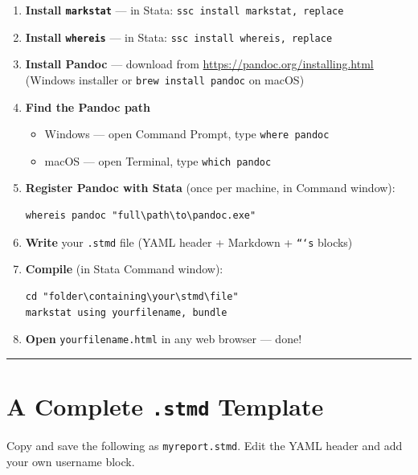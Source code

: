 \documentclass[paper=a4, fontsize=11pt]{scrartcl}
\newcommand{\horrule}[1]{\rule{\linewidth}{#1}}
\begin{document}
\begin{enumerate}
  \item[\(\square\)] \textbf{Install \texttt{markstat}} --- in Stata: \texttt{ssc install markstat, replace}
  \item[\(\square\)] \textbf{Install \texttt{whereis}} --- in Stata: \texttt{ssc install whereis, replace}
  \item[\(\square\)] \textbf{Install Pandoc} --- download from \url{https://pandoc.org/installing.html}
        (Windows installer or \texttt{brew install pandoc} on macOS)
  \item[\(\square\)] \textbf{Find the Pandoc path}
        \begin{itemize}
          \item Windows --- open Command Prompt, type \texttt{where pandoc}
          \item macOS --- open Terminal, type \texttt{which pandoc}
        \end{itemize}
  \item[\(\square\)] \textbf{Register Pandoc with Stata} (once per machine, in Command window):
\begin{lstlisting}[style=stata]
whereis pandoc "full\path\to\pandoc.exe"
\end{lstlisting}
  \item[\(\square\)] \textbf{Write} your \texttt{.stmd} file (YAML header + Markdown + \texttt{```s} blocks)
  \item[\(\square\)] \textbf{Compile} (in Stata Command window):
\begin{lstlisting}[style=stata]
cd "folder\containing\your\stmd\file"
markstat using yourfilename, bundle
\end{lstlisting}
  \item[\(\square\)] \textbf{Open} \texttt{yourfilename.html} in any web browser --- done!
\end{enumerate}

\bigskip\horrule{0.4pt}\bigskip

\section{A Complete \texttt{.stmd} Template}

Copy and save the following as \texttt{myreport.stmd}.
Edit the YAML header and add your own username block.
\end{document}
